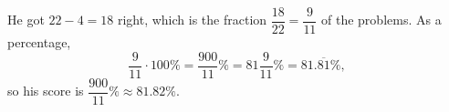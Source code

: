 He got $22-4=18$ right, which is the fraction $\dfrac{18}{22}=\dfrac{9}{11}$ of the problems. As a percentage,
\[
\dfrac{9}{11}\cdot100\%=\dfrac{900}{11}\%=81\dfrac{9}{11}\%=81.\overline{81}\%,
\]
so his score is $\boxed{\dfrac{900}{11}\%\approx81.82\%}$.
